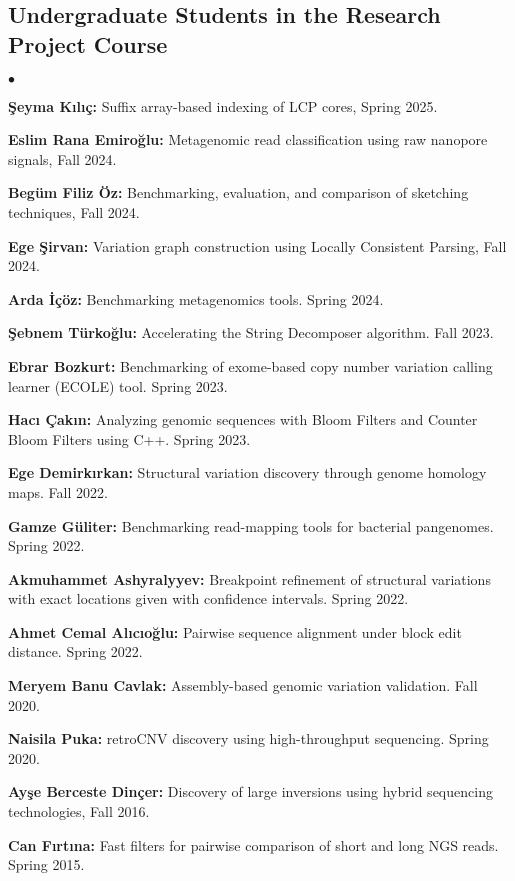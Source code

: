 \documentclass[margin,line]{res}
\newenvironment{list2}{
  \begin{list}{$\bullet$}{%
      \setlength{\itemsep}{0.1cm}
      \setlength{\parsep}{0in} \setlength{\parskip}{0in}
      \setlength{\topsep}{0in} \setlength{\partopsep}{0in} 
      \setlength{\leftmargin}{0.2in}}}{\end{list}}
\begin{document}
\begin{resume}
  \subsection{\small \sc Undergraduate Students in the Research Project Course}
  \begin{list2}
  \item \textbf{Şeyma Kılıç:} Suffix array-based indexing of LCP cores, Spring 2025.
  \item \textbf{Eslim Rana Emiroğlu:} Metagenomic read classification using raw nanopore signals, Fall 2024.
 \item \textbf{Begüm Filiz Öz:} Benchmarking, evaluation, and comparison of sketching techniques, Fall 2024.
 \item \textbf{Ege Şirvan:} Variation graph construction using Locally Consistent Parsing, Fall 2024.
\item
    {\bf Arda İçöz:} Benchmarking metagenomics tools. Spring 2024.
\item
    {\bf Şebnem Türkoğlu:} Accelerating the String Decomposer algorithm. Fall 2023.
    \item
    {\bf Ebrar Bozkurt:} Benchmarking of exome-based copy number variation calling learner (ECOLE) tool. Spring 2023.
\item
    {\bf Hacı Çakın:} Analyzing genomic sequences with Bloom
Filters and Counter Bloom Filters using C++. Spring 2023.
   \item \textbf{Ege Demirkırkan:} Structural variation discovery through genome homology maps. Fall 2022.
   \item \textbf{Gamze Güliter:} Benchmarking read-mapping tools for bacterial pangenomes. Spring 2022.
   
 \item \textbf{Akmuhammet Ashyralyyev:} Breakpoint refinement of structural variations with exact locations given with confidence intervals. Spring 2022.
 \item \textbf{Ahmet Cemal Alıcıoğlu:} Pairwise sequence alignment under block edit distance. Spring 2022.
\item 
  {\bf Meryem Banu Cavlak:} Assembly-based genomic variation validation. Fall 2020.
  \item
    {\bf Naisila Puka:} retroCNV discovery using high-throughput sequencing. Spring 2020.
  \item
    {\bf Ayşe Berceste Dinçer:} Discovery of large inversions using hybrid sequencing technologies, Fall 2016.
  \item
    {\bf Can Fırtına:} Fast filters for pairwise comparison of short and long NGS reads. Spring 2015.


\end{list2}
\end{resume}
\end{document}
